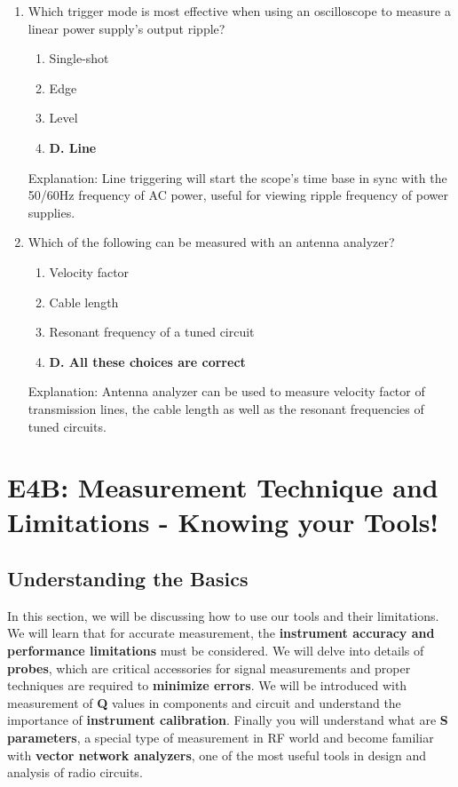 \begin{enumerate}
     \item Which trigger mode is most effective when using an oscilloscope to measure a linear power supply's output ripple?
       \begin{enumerate}
       \item  Single-shot
         \item  Edge
      \item  Level
       \item \textbf{D. Line}
        \end{enumerate}
         \textcolor{myred}{Explanation:}
        Line triggering will start the scope's time base in sync with the 50/60Hz frequency of AC power, useful for viewing ripple frequency of power supplies.
     
      \item Which of the following can be measured with an antenna analyzer?
         \begin{enumerate}
         \item  Velocity factor
       \item  Cable length
      \item  Resonant frequency of a tuned circuit
      \item \textbf{D. All these choices are correct}
    \end{enumerate}
        \textcolor{myred}{Explanation:}
       Antenna analyzer can be used to measure velocity factor of transmission lines, the cable length as well as the resonant frequencies of tuned circuits.

\end{enumerate}

\section{E4B: Measurement Technique and Limitations - Knowing your Tools!}

\subsection*{Understanding the Basics}
In this section, we will be discussing how to use our tools and their limitations. We will learn that for accurate measurement, the \textcolor{myblue}{\textbf{instrument accuracy and performance limitations}} must be considered. We will delve into details of  \textcolor{myblue}{\textbf{probes}}, which are critical accessories for signal measurements and proper techniques are required to \textcolor{myblue}{\textbf{minimize errors}}. We will be introduced with measurement of \textcolor{myblue}{\textbf{Q}} values in components and circuit and understand the importance of \textcolor{myblue}{\textbf{instrument calibration}}. Finally you will understand what are \textcolor{myblue}{\textbf{S parameters}}, a special type of measurement in RF world and become familiar with \textcolor{myblue}{\textbf{vector network analyzers}}, one of the most useful tools in design and analysis of radio circuits.

